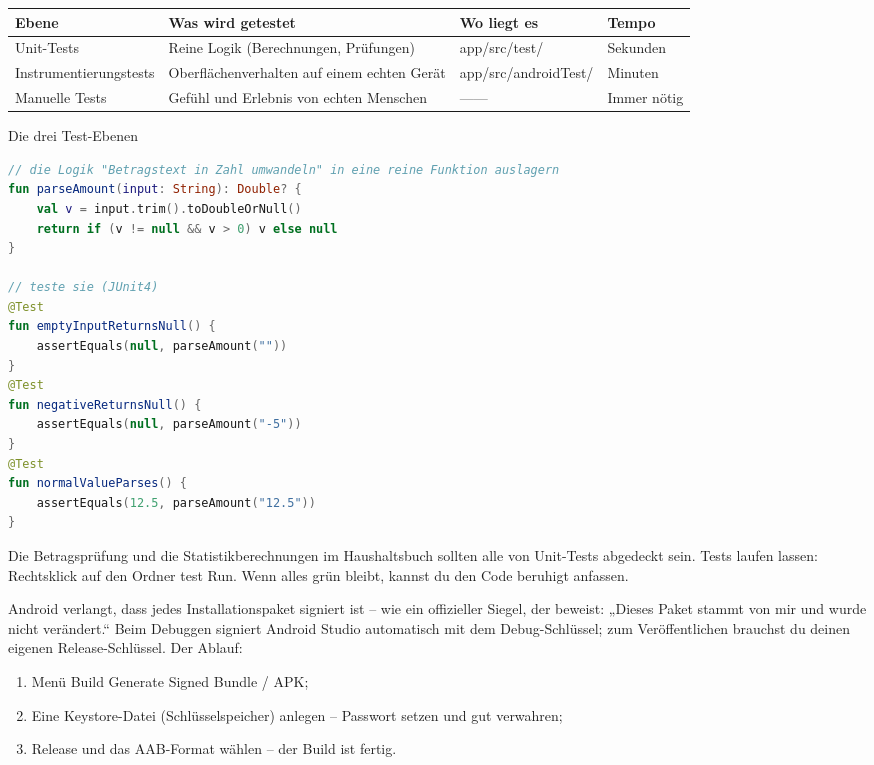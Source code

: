 \begin{center}
\begin{tabularx}{\linewidth}{|X|X|X|X|}
\hline
\textbf{Ebene} & \textbf{Was wird getestet} & \textbf{Wo liegt es} & \textbf{Tempo} \tabularnewline
\hline
Unit-Tests & Reine Logik (Berechnungen, Prüfungen) & app/src/test/ & Sekunden \tabularnewline
Instrumentierungstests & Oberflächenverhalten auf einem echten Gerät & app/src/androidTest/ & Minuten \tabularnewline
Manuelle Tests & Gefühl und Erlebnis von echten Menschen & —— & Immer nötig \tabularnewline
\hline
\end{tabularx}
\end{center}

\begin{center}\small\color{gray}Die drei Test-Ebenen\end{center}

\begin{lstlisting}[language=Kotlin]
// die Logik "Betragstext in Zahl umwandeln" in eine reine Funktion auslagern
fun parseAmount(input: String): Double? {
    val v = input.trim().toDoubleOrNull()
    return if (v != null && v > 0) v else null
}

// teste sie (JUnit4)
@Test
fun emptyInputReturnsNull() {
    assertEquals(null, parseAmount(""))
}
@Test
fun negativeReturnsNull() {
    assertEquals(null, parseAmount("-5"))
}
@Test
fun normalValueParses() {
    assertEquals(12.5, parseAmount("12.5"))
}
\end{lstlisting}

Die Betragsprüfung und die Statistikberechnungen im Haushaltsbuch sollten alle von Unit-Tests abgedeckt sein. Tests laufen lassen: Rechtsklick auf den Ordner test Run. Wenn alles grün bleibt, kannst du den Code beruhigt anfassen.


Android verlangt, dass jedes Installationspaket signiert ist – wie ein offizieller Siegel, der beweist: „Dieses Paket stammt von mir und wurde nicht verändert.“ Beim Debuggen signiert Android Studio automatisch mit dem Debug-Schlüssel; zum Veröffentlichen brauchst du deinen eigenen Release-Schlüssel. Der Ablauf:

\begin{enumerate}
  \item Menü Build Generate Signed Bundle / APK;
  \item Eine Keystore-Datei (Schlüsselspeicher) anlegen – Passwort setzen und gut verwahren;
  \item Release und das AAB-Format wählen – der Build ist fertig.
\end{enumerate}

